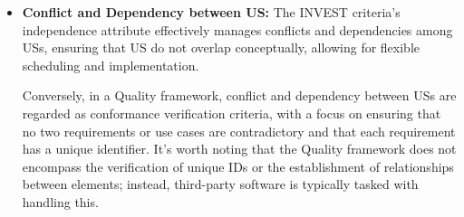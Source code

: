 \begin{itemize}
\item \textbf{Conflict and Dependency between US:} The INVEST criteria's independence attribute effectively manages conflicts and dependencies among USs, ensuring that US do not overlap conceptually, allowing for flexible scheduling and implementation. 

Conversely, in a Quality framework, conflict and dependency between USs are regarded as conformance verification criteria, with a focus on ensuring that no two requirements or use cases are contradictory and that each requirement has a unique identifier. It's worth noting that the Quality framework does not encompass the verification of unique IDs or the establishment of relationships between elements; instead, third-party software is typically tasked with handling this. 


\end{itemize}
